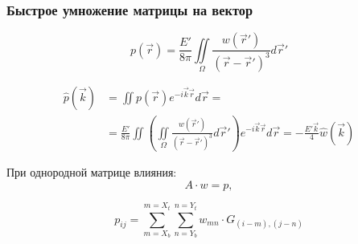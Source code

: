\documentclass[10pt]{beamer}
\begin{document}






\begin{frame}
	\frametitle{Быстрое умножение матрицы на вектор}
	
	\begin{equation}
		p(\vec{r}) = \frac{E'}{8 \pi} \iint\limits_{\Omega} \frac{w(\vec{r}')}{(\vec{r}-\vec{r}')^3} d\vec{r}'
	\end{equation}

	\begin{equation}
		\begin{split}
			\hat{p}(\vec{k}) & = \iint p(\vec{r}) e^{-i\vec{k}\vec{r}} d\vec{r} = \\
			& = \frac{E'}{8 \pi} \iint \left( \iint\limits_{\Omega} 
			\frac{w(\vec{r}')}{(\vec{r}-\vec{r}')^3} d\vec{r}' \right) e^{-i\vec{k}\vec{r}} d\vec{r} 
			= - \frac{E' \vec{k}}{4} \hat{w} (\vec{k})
		\end{split}
	\end{equation}
	
	При однородной матрице влияния:
	\begin{equation}
		A\cdot w = p,
	\end{equation}

	\begin{equation}
		p_{ij} = \sum \limits_{m=X_b}^{m=X_t} \sum \limits_{n=Y_b}^{n=Y_t} w_{mn} \cdot G_{(i-m), (j-n)}
	\end{equation}

\end{frame}
\end{document}

